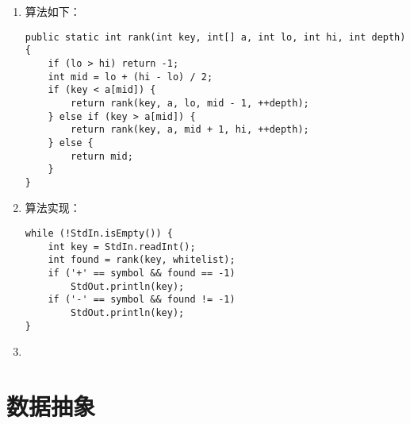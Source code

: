 \begin{enumerate}
	\item 算法如下：
	\begin{lstlisting}
public static int rank(int key, int[] a, int lo, int hi, int depth) {
	if (lo > hi) return -1;
	int mid = lo + (hi - lo) / 2;
	if (key < a[mid]) {
		return rank(key, a, lo, mid - 1, ++depth);
	} else if (key > a[mid]) {
		return rank(key, a, mid + 1, hi, ++depth);
	} else {
		return mid;
	}
}
	\end{lstlisting}
	\item 算法实现：
	\begin{lstlisting}
while (!StdIn.isEmpty()) {
	int key = StdIn.readInt();
	int found = rank(key, whitelist);
	if ('+' == symbol && found == -1)
		StdOut.println(key);
	if ('-' == symbol && found != -1)
		StdOut.println(key);
}
	\end{lstlisting}
	\item 
\end{enumerate}

\section{数据抽象}
